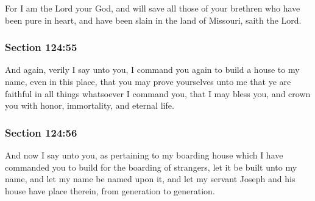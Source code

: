 		For I am the Lord your God, and will save all those of your brethren who have been pure in heart, and have been slain in the land of Missouri, saith the Lord.


	\subsubsection{Section 124:55} %
		\label{DC124-55}

		And again, verily I say unto you, I command you again to build a house to my name, even in this place, that you may prove yourselves unto me that ye are faithful in all things whatsoever I command you, that I may bless you, and crown you with honor, immortality, and eternal life.


	\subsubsection{Section 124:56} %
		\label{DC124-56}

		And now I say unto you, as pertaining to my boarding house which I have commanded you to build for the boarding of strangers, let it be built unto my name, and let my name be named upon it, and let my servant Joseph and his house have place therein, from generation to generation.


